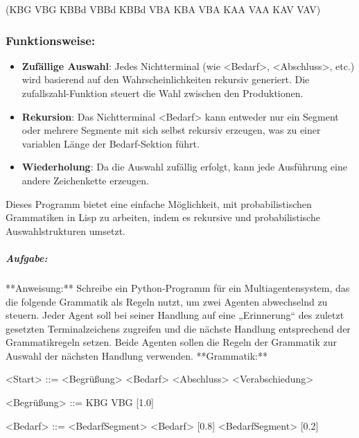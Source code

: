 \documentclass[
]{article}
\begin{document}
(KBG VBG KBBd VBBd KBBd VBA KBA VBA KAA VAA KAV VAV)

\subsubsection{\texorpdfstring{\textbf{Funktionsweise:}}{Funktionsweise:}}\label{funktionsweise}

\begin{itemize}
\item
  \textbf{Zufällige Auswahl}: Jedes Nichtterminal (wie
  \textless Bedarf\textgreater, \textless Abschluss\textgreater, etc.)
  wird basierend auf den Wahrscheinlichkeiten rekursiv generiert. Die
  zufallszahl-Funktion steuert die Wahl zwischen den Produktionen.
\item
  \textbf{Rekursion}: Das Nichtterminal \textless Bedarf\textgreater{}
  kann entweder nur ein Segment oder mehrere Segmente mit sich selbst
  rekursiv erzeugen, was zu einer variablen Länge der Bedarf-Sektion
  führt.
\item
  \textbf{Wiederholung}: Da die Auswahl zufällig erfolgt, kann jede
  Ausführung eine andere Zeichenkette erzeugen.
\end{itemize}

Dieses Programm bietet eine einfache Möglichkeit, mit probabilistischen
Grammatiken in Lisp zu arbeiten, indem es rekursive und probabilistische
Auswahlstrukturen umsetzt.

\subparagraph{\texorpdfstring{\textbf{Aufgabe:}}{Aufgabe:}}\label{aufgabe-5}

**Anweisung:** Schreibe ein Python-Programm für ein Multiagentensystem,
das die folgende Grammatik als Regeln nutzt, um zwei Agenten abwechselnd
zu steuern. Jeder Agent soll bei seiner Handlung auf eine „Erinnerung``
des zuletzt gesetzten Terminalzeichens zugreifen und die nächste
Handlung entsprechend der Grammatikregeln setzen. Beide Agenten sollen
die Regeln der Grammatik zur Auswahl der nächsten Handlung verwenden.
**Grammatik:**

\textless Start\textgreater{} ::= \textless Begrüßung\textgreater{}
\textless Bedarf\textgreater{} \textless Abschluss\textgreater{}
\textless Verabschiedung\textgreater{}

\textless Begrüßung\textgreater{} ::= KBG VBG {[}1.0{]}

\textless Bedarf\textgreater{} ::= \textless BedarfSegment\textgreater{}
\textless Bedarf\textgreater{} {[}0.8{]} \textbar{}
\textless BedarfSegment\textgreater{} {[}0.2{]}
\end{document}
